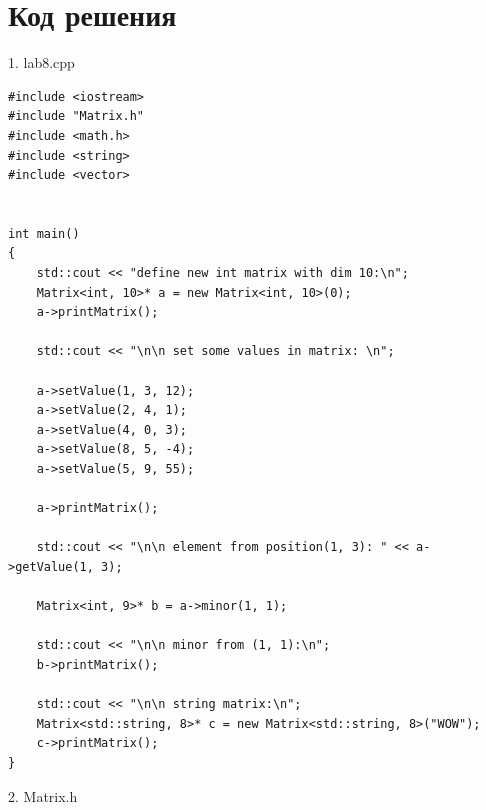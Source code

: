 ﻿\documentclass[a4paper, 12pt]{extarticle}
\begin{document}
\section{Код решения}
1. lab8.cpp
\begin{verbatim}
#include <iostream>
#include "Matrix.h"
#include <math.h>
#include <string>
#include <vector>


int main()
{
	std::cout << "define new int matrix with dim 10:\n";
	Matrix<int, 10>* a = new Matrix<int, 10>(0);
	a->printMatrix();

	std::cout << "\n\n set some values in matrix: \n";

	a->setValue(1, 3, 12);
	a->setValue(2, 4, 1);
	a->setValue(4, 0, 3);
	a->setValue(8, 5, -4);
	a->setValue(5, 9, 55);

	a->printMatrix();

	std::cout << "\n\n element from position(1, 3): " << a->getValue(1, 3);

	Matrix<int, 9>* b = a->minor(1, 1);

	std::cout << "\n\n minor from (1, 1):\n";
	b->printMatrix();

	std::cout << "\n\n string matrix:\n";
	Matrix<std::string, 8>* c = new Matrix<std::string, 8>("WOW");
	c->printMatrix();
}
\end{verbatim}
2. Matrix.h
\end{document}
